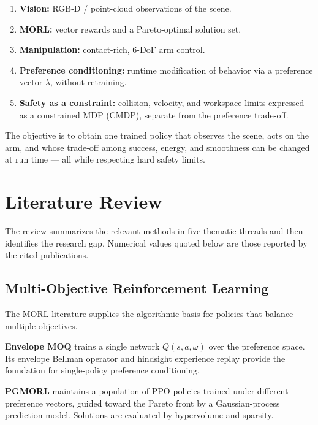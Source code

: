 \documentclass[11pt,a4paper]{article}
\begin{document}
\begin{enumerate}
  \item \textbf{Vision:} RGB-D / point-cloud observations of the scene.
  \item \textbf{MORL:} vector rewards and a Pareto-optimal solution set.
  \item \textbf{Manipulation:} contact-rich, 6-DoF arm control.
  \item \textbf{Preference conditioning:} runtime modification of
  behavior via a preference vector $\lambda$, without retraining.
  \item \textbf{Safety as a constraint:} collision, velocity, and
  workspace limits expressed as a constrained MDP (CMDP), separate from
  the preference trade-off.
\end{enumerate}

The objective is to obtain one trained policy that observes the scene,
acts on the arm, and whose trade-off among success, energy, and
smoothness can be changed at run time --- all while respecting hard
safety limits.

\section{Literature Review}

The review summarizes the relevant methods in five thematic threads and
then identifies the research gap. Numerical values quoted below are those
reported by the cited publications.

\subsection{Multi-Objective Reinforcement Learning}

The MORL literature supplies the algorithmic basis for policies that
balance multiple objectives.

\textbf{Envelope MOQ} \cite{yang2019} trains a single network
$Q(s,a,\omega)$ over the preference space. Its envelope Bellman operator
and hindsight experience replay provide the foundation for
single-policy preference conditioning.

\textbf{PGMORL} \cite{xu2020} maintains a population of PPO policies
trained under different preference vectors, guided toward the Pareto
front by a Gaussian-process prediction model. Solutions are evaluated by
hypervolume and sparsity.
\end{document}
